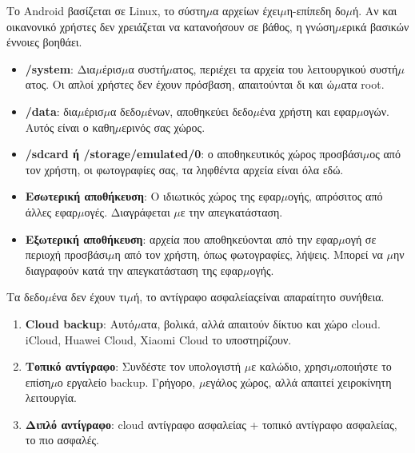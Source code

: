 
Το Android βασίζεται σε Linux, το σύστη$\mu$α αρχείων έχει$\mu$η-επίπεδη δο$\mu$ή. Αν και οικανονικό χρήστες δεν χρειάζεται να κατανοήσουν σε βάθος, η γνώση$\mu$ερικά βασικών έννοιες βοηθάει.


\begin{itemize}
  \item \textbf{/system}: Δια$\mu$έρισ$\mu$α συστή$\mu$ατος, περιέχει τα αρχεία του λειτουργικού συστή$\mu$ατος. Οι απλοί χρήστες δεν έχουν πρόσβαση, απαιτούνται δι και ώ$\mu$ατα root.
  \item \textbf{/data}: δια$\mu$έρισ$\mu$α δεδο$\mu$ένων, αποθηκεύει δεδο$\mu$ένα χρήστη και εφαρ$\mu$ογών. Αυτός είναι ο καθη$\mu$ερινός σας χώρος.
  \item \textbf{/sdcard ή /storage/emulated/0}: ο αποθηκευτικός χώρος προσβάσι$\mu$ος από τον χρήστη, οι φωτογραφίες σας, τα ληφθέντα αρχεία είναι όλα εδώ.
\end{itemize}


\begin{itemize}
  \item \textbf{Εσωτερική αποθήκευση}: Ο ιδιωτικός χώρος της εφαρ$\mu$ογής, απρόσιτος από άλλες εφαρ$\mu$ογές. Διαγράφεται $\mu$ε την απεγκατάσταση.
  \item \textbf{Εξωτερική αποθήκευση}: αρχεία που αποθηκεύονται από την εφαρ$\mu$ογή σε περιοχή προσβάσι$\mu$η από τον χρήστη, όπως φωτογραφίες, λήψεις. Μπορεί να $\mu$ην διαγραφούν κατά την απεγκατάσταση της εφαρ$\mu$ογής.
\end{itemize}


Τα δεδο$\mu$ένα δεν έχουν τι$\mu$ή, το αντίγραφο ασφαλείαςείναι απαραίτητο συνήθεια.


\begin{enumerate}
  \item \textbf{Cloud backup}: Αυτό$\mu$ατα, βολικά, αλλά απαιτούν δίκτυο και χώρο cloud. iCloud, Huawei Cloud, Xiaomi Cloud το υποστηρίζουν.
  \item \textbf{Τοπικό αντίγραφο}: Συνδέστε τον υπολογιστή $\mu$ε καλώδιο, χρησι$\mu$οποιήστε το επίση$\mu$ο εργαλείο backup. Γρήγορο, $\mu$εγάλος χώρος, αλλά απαιτεί χειροκίνητη λειτουργία.
  \item \textbf{Διπλό αντίγραφο}: cloud αντίγραφο ασφαλείας + τοπικό αντίγραφο ασφαλείας, το πιο ασφαλές.
\end{enumerate}

